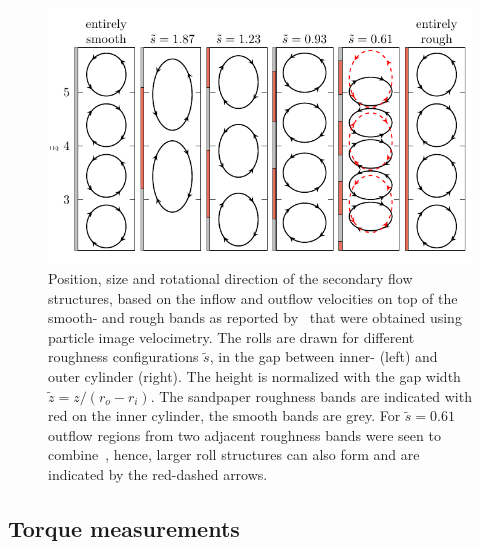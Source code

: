 \documentclass[aps,twocolumn,10pt,floatfix, superscriptaddress,longbibliography,pra]{revtex4-1}
\begin{document}
\begin{figure}
    \includegraphics[scale=1]{./figures/fig4_rolls}
    \caption{Position, size and rotational direction of the secondary flow structures, based on the inflow and outflow velocities on top of the smooth- and rough bands as reported by~\cite{Bakhuis2019} that were obtained using particle image velocimetry. The rolls are drawn for different roughness configurations $\tilde{s}$, in the gap between inner- (left) and outer cylinder (right). The height is normalized with the gap width $\tilde{z} = z/(r_o - r_i)$. The sandpaper roughness bands are indicated with red on the inner cylinder, the smooth bands are grey. For $\tilde{s}=0.61$ outflow regions from two adjacent roughness bands were seen to combine~\citep{Bakhuis2019}, hence, larger roll structures can also form and are indicated by the red-dashed arrows.}
    \label{fig:rolls}
\end{figure}

\subsection{Torque measurements}
\end{document}
